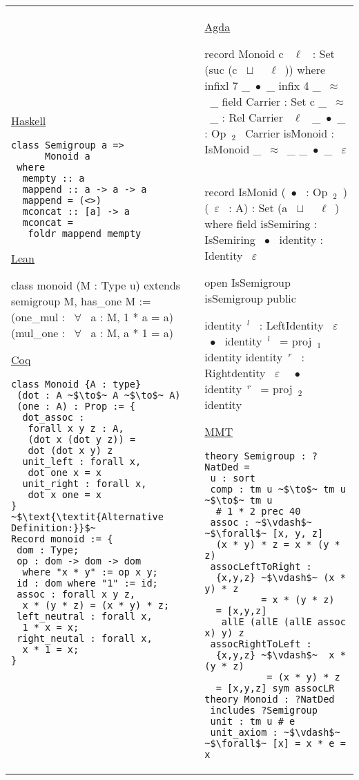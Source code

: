 \footnotesize
\begin{tabular}{p{6.3cm} p{7cm}}
\underline{Haskell}
\begin{verbatim}
class Semigroup a => 
      Monoid a 
 where 
  mempty :: a 
  mappend :: a -> a -> a 
  mappend = (<>) 
  mconcat :: [a] -> a 
  mconcat = 
   foldr mappend mempty 
\end{verbatim} 
\underline{Lean}
\begin{leancode}
class monoid (M : Type u)
 extends semigroup M, 
         has_one M :=
  (one_mul : ~$\forall$~ a : M, 
           1 * a = a) 
  (mul_one : ~$\forall$~ a : M, 
           a * 1 = a)   
\end{leancode} 
\underline{Coq}
\begin{verbatim}
class Monoid {A : type}
 (dot : A ~$\to$~ A ~$\to$~ A)
 (one : A) : Prop := {
  dot_assoc : 
   forall x y z : A, 
   (dot x (dot y z)) = 
   dot (dot x y) z
  unit_left : forall x, 
   dot one x = x 
  unit_right : forall x, 
   dot x one = x              
}
~$\text{\textit{Alternative Definition:}}$~
Record monoid := {
 dom : Type; 
 op : dom -> dom -> dom 
  where "x * y" := op x y; 
 id : dom where "1" := id; 
 assoc : forall x y z, 
  x * (y * z) = (x * y) * z; 
 left_neutral : forall x,   
  1 * x = x; 
 right_neutal : forall x,
  x * 1 = x; 
}
\end{verbatim} 
&
\underline{Agda}
\begin{agdacode}
record Monoid c ~$\ell$~ : 
   Set (suc (c ~$\sqcup$~ ~$\ell$~)) where 
 infixl 7 _~$\bullet$~_
 infix 4 _~$\approx$~_
 field 
  Carrier : Set c 
  _~$\approx$~_ : Rel Carrier ~$\ell$~ 
  _~$\bullet$~_ : Op~$_2$~ Carrier 
  isMonoid : IsMonoid _~$\approx$~_ _~$\bullet$~_ ~$\varepsilon$~ 
  
record IsMonid (~$\bullet$~ : Op~$_2$~) (~$\varepsilon$~ : A) 
 : Set (a ~$\sqcup$~ ~$\ell$~) where 
  field 
   isSemiring : IsSemiring ~$\bullet$~ 
   identity : Identity ~$\varepsilon$~ 
       
   open IsSemigroup isSemigroup public 
   
   identity~$^l$~ : LeftIdentity ~$\varepsilon$~ ~$\bullet$~ 
   identity~$^l$~ = proj~$_1$~ identity 
   identity~$^r$~ : Rightdentity ~$\varepsilon$~ ~$\bullet$~ 
   identity~$^r$~ = proj~$_2$~ identity        
\end{agdacode}       
\underline{MMT}
\begin{verbatim} 
theory Semigroup : ?NatDed = 
 u : sort 
 comp : tm u ~$\to$~ tm u ~$\to$~ tm u 
  # 1 * 2 prec 40
 assoc : ~$\vdash$~ ~$\forall$~ [x, y, z]
  (x * y) * z = x * (y * z)    
 assocLeftToRight : 
  {x,y,z} ~$\vdash$~ (x * y) * z 
          = x * (y * z) 
  = [x,y,z] 
   allE (allE (allE assoc x) y) z
 assocRightToLeft : 
  {x,y,z} ~$\vdash$~  x * (y * z) 
           = (x * y) * z 
  = [x,y,z] sym assocLR 
theory Monoid : ?NatDed 
 includes ?Semigroup 
 unit : tm u # e 
 unit_axiom : ~$\vdash$~ ~$\forall$~ [x] = x * e = x       
\end{verbatim}      
\end{tabular}  
